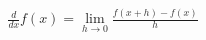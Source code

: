 \documentclass[preview]{standalone}
\begin{document}
\begin{align*}
\frac{d}{dx}f(x) = \lim_{h\to0}\frac{f(x+h)-f(x)}{h}
\end{align*}
\end{document}
